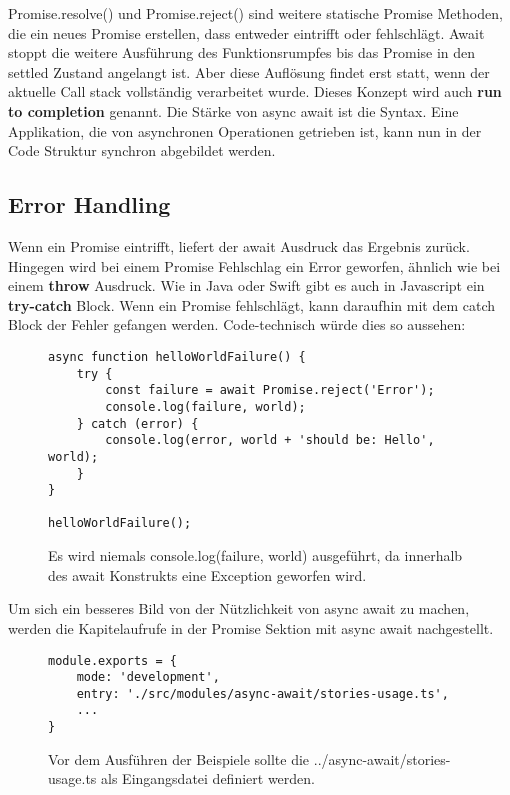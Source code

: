 \noindent
Promise.resolve() und Promise.reject() sind weitere statische Promise Methoden, die ein neues Promise erstellen, dass entweder eintrifft oder fehlschlägt. Await stoppt die weitere Ausführung des Funktionsrumpfes bis das Promise in den settled Zustand angelangt ist. Aber diese Auflösung findet erst statt, wenn der aktuelle Call stack vollständig verarbeitet wurde. Dieses Konzept wird auch \textbf{run to completion} genannt. Die Stärke von async await ist die Syntax. Eine Applikation, die von asynchronen Operationen getrieben ist, kann nun in der Code Struktur synchron abgebildet werden. 

\subsection{Error Handling}
Wenn ein Promise eintrifft, liefert der await Ausdruck das Ergebnis zurück. Hingegen wird bei einem Promise Fehlschlag ein Error geworfen, ähnlich wie bei einem \textbf{throw} Ausdruck. Wie in Java oder Swift gibt es auch in Javascript ein \textbf{try-catch} Block. Wenn ein Promise fehlschlägt, kann daraufhin mit dem catch Block der Fehler gefangen werden. Code-technisch würde dies so aussehen: 

\begin{figure}[H]
\begin{lstlisting}[basicstyle=\small]
async function helloWorldFailure() {
    try {
        const failure = await Promise.reject('Error');
        console.log(failure, world);
    } catch (error) {
        console.log(error, world + 'should be: Hello', world);
    }
}

helloWorldFailure();
\end{lstlisting}
\caption{Es wird niemals console.log(failure, world) ausgeführt, da innerhalb des await Konstrukts eine Exception geworfen wird.}
\end{figure}

\noindent
Um sich ein besseres Bild von der Nützlichkeit von async await zu machen, werden die Kapitelaufrufe in der Promise Sektion mit async await nachgestellt. 

\begin{figure}[H]
\begin{lstlisting}[basicstyle=\small]
module.exports = {
    mode: 'development',
    entry: './src/modules/async-await/stories-usage.ts',
    ...
}
\end{lstlisting}
\caption{Vor dem Ausführen der Beispiele sollte die ../async-await/stories-usage.ts als Eingangsdatei definiert werden.}
\end{figure}

